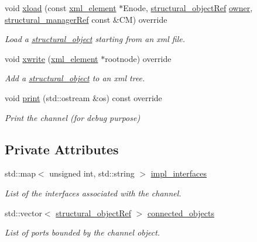 \begin{DoxyCompactItemize}
void \hyperlink{classchannel__o_aa3a1b88c7d037f8712d927e4e27db8ce}{xload} (const \hyperlink{classxml__element}{xml\+\_\+element} $\ast$Enode, \hyperlink{structural__objects_8hpp_a8ea5f8cc50ab8f4c31e2751074ff60b2}{structural\+\_\+object\+Ref} \hyperlink{classstructural__object_a3e96b3e00b8a78adfc44872d82e186ea}{owner}, \hyperlink{structural__manager_8hpp_ab3136f0e785d8535f8d252a7b53db5b5}{structural\+\_\+manager\+Ref} const \&CM) override
\begin{DoxyCompactList}\small\item\em Load a \hyperlink{classstructural__object}{structural\+\_\+object} starting from an xml file. \end{DoxyCompactList}\item 
void \hyperlink{classchannel__o_aa9272c96bee02d7ef08ef3d589725a6d}{xwrite} (\hyperlink{classxml__element}{xml\+\_\+element} $\ast$rootnode) override
\begin{DoxyCompactList}\small\item\em Add a \hyperlink{classstructural__object}{structural\+\_\+object} to an xml tree. \end{DoxyCompactList}\item 
void \hyperlink{classchannel__o_ad3730f48e78b2404ab9acacf200cef73}{print} (std\+::ostream \&os) const override
\begin{DoxyCompactList}\small\item\em Print the channel (for debug purpose) \end{DoxyCompactList}\end{DoxyCompactItemize}
\subsection*{Private Attributes}
\begin{DoxyCompactItemize}
\item 
std\+::map$<$ unsigned int, std\+::string $>$ \hyperlink{classchannel__o_a20d11d1f89c57c8da3b8225016c06450}{impl\+\_\+interfaces}
\begin{DoxyCompactList}\small\item\em List of the interfaces associated with the channel. \end{DoxyCompactList}\item 
std\+::vector$<$ \hyperlink{structural__objects_8hpp_a8ea5f8cc50ab8f4c31e2751074ff60b2}{structural\+\_\+object\+Ref} $>$ \hyperlink{classchannel__o_ab64ac6fc98c5f62393c28bac97fa31a4}{connected\+\_\+objects}
\begin{DoxyCompactList}\small\item\em List of ports bounded by the channel object. \end{DoxyCompactList}\end{DoxyCompactItemize}
